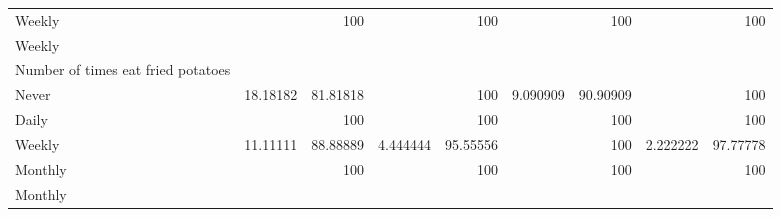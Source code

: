 \documentclass{article}
\begin{document}
\begin{tabular}{lllllllll}
\multicolumn{1}{l}{\hspace{7em}Weekly} &
  \multicolumn{1}{|r}{} &
  \multicolumn{1}{r}{100} &
  \multicolumn{1}{r}{} &
  \multicolumn{1}{r}{100} &
  \multicolumn{1}{r}{} &
  \multicolumn{1}{r}{100} &
  \multicolumn{1}{r}{} &
  \multicolumn{1}{r}{100} \\
\multicolumn{1}{l}{\hspace{5em}Weekly} &
  \multicolumn{1}{|r}{} &
  \multicolumn{1}{r}{} &
  \multicolumn{1}{r}{} &
  \multicolumn{1}{r}{} &
  \multicolumn{1}{r}{} &
  \multicolumn{1}{r}{} &
  \multicolumn{1}{r}{} &
  \multicolumn{1}{r}{} \\
\multicolumn{1}{l}{\hspace{6em}Number of times eat fried potatoes} &
  \multicolumn{1}{|r}{} &
  \multicolumn{1}{r}{} &
  \multicolumn{1}{r}{} &
  \multicolumn{1}{r}{} &
  \multicolumn{1}{r}{} &
  \multicolumn{1}{r}{} &
  \multicolumn{1}{r}{} &
  \multicolumn{1}{r}{} \\
\multicolumn{1}{l}{\hspace{7em}Never} &
  \multicolumn{1}{|r}{18.18182} &
  \multicolumn{1}{r}{81.81818} &
  \multicolumn{1}{r}{} &
  \multicolumn{1}{r}{100} &
  \multicolumn{1}{r}{9.090909} &
  \multicolumn{1}{r}{90.90909} &
  \multicolumn{1}{r}{} &
  \multicolumn{1}{r}{100} \\
\multicolumn{1}{l}{\hspace{7em}Daily} &
  \multicolumn{1}{|r}{} &
  \multicolumn{1}{r}{100} &
  \multicolumn{1}{r}{} &
  \multicolumn{1}{r}{100} &
  \multicolumn{1}{r}{} &
  \multicolumn{1}{r}{100} &
  \multicolumn{1}{r}{} &
  \multicolumn{1}{r}{100} \\
\multicolumn{1}{l}{\hspace{7em}Weekly} &
  \multicolumn{1}{|r}{11.11111} &
  \multicolumn{1}{r}{88.88889} &
  \multicolumn{1}{r}{4.444444} &
  \multicolumn{1}{r}{95.55556} &
  \multicolumn{1}{r}{} &
  \multicolumn{1}{r}{100} &
  \multicolumn{1}{r}{2.222222} &
  \multicolumn{1}{r}{97.77778} \\
\multicolumn{1}{l}{\hspace{7em}Monthly} &
  \multicolumn{1}{|r}{} &
  \multicolumn{1}{r}{100} &
  \multicolumn{1}{r}{} &
  \multicolumn{1}{r}{100} &
  \multicolumn{1}{r}{} &
  \multicolumn{1}{r}{100} &
  \multicolumn{1}{r}{} &
  \multicolumn{1}{r}{100} \\
\multicolumn{1}{l}{\hspace{5em}Monthly} &
  \multicolumn{1}{|r}{} &
  \multicolumn{1}{r}{} &
  \multicolumn{1}{r}{} &
  \multicolumn{1}{r}{} &
  \multicolumn{1}{r}{} &

\end{tabular}
\end{document}
